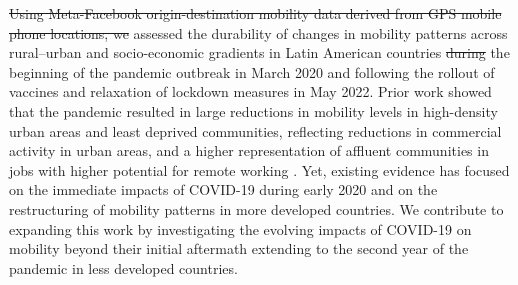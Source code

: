 \documentclass[fleqn,10pt]{wlscirep}
\providecommand{\DIFadd}[1]{{\protect\color{blue}\uwave{#1}}} %
\providecommand{\DIFdel}[1]{{\protect\color{red}\sout{#1}}}                      %
\providecommand{\DIFaddbegin}{} %
\providecommand{\DIFaddend}{} %
\providecommand{\DIFdelbegin}{} %
\providecommand{\DIFdelend}{} %
\begin{document}
\DIFdelbegin %

\DIFdel{Using Meta-Facebook origin-destination mobility data derived from GPS mobile phone locations, we }\DIFdelend \DIFaddbegin \DIFadd{We }\DIFaddend assessed the durability of changes in mobility patterns across rural–urban and socio-economic gradients in Latin American countries \DIFdelbegin \DIFdel{during }\DIFdelend \DIFaddbegin \DIFadd{from }\DIFaddend the beginning of the pandemic outbreak in March 2020 and following the rollout of vaccines and relaxation of lockdown measures in May 2022. Prior work showed that the pandemic resulted in large reductions in mobility levels in high-density urban areas and least deprived communities, reflecting reductions in commercial activity in urban areas, and a higher representation of affluent communities in jobs with higher potential for remote working \cite{bartik2020jobs}. Yet, existing evidence has focused on the immediate impacts of COVID-19 during early 2020 and on the restructuring of mobility patterns in more developed countries. We contribute to expanding this work by investigating the evolving impacts of COVID-19 on mobility beyond their initial aftermath extending to the second year of the pandemic in less developed countries.
\end{document}
